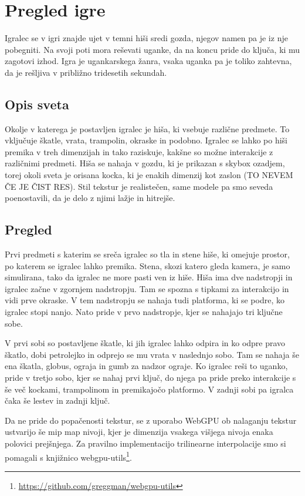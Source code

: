 \documentclass[a4paper,12pt]{article}
\begin{document}
\newpage

\section{Pregled igre}

\noindent Igralec se v igri znajde ujet v temni hiši sredi gozda, njegov namen pa je iz nje pobegniti. Na svoji poti mora reševati uganke, da na koncu pride do ključa, ki mu zagotovi izhod. Igra je ugankarskega žanra, vsaka uganka pa je toliko zahtevna, da je rešljiva v približno tridesetih sekundah.


\subsection{Opis sveta}
\noindent Okolje v katerega je postavljen igralec je hiša, ki vsebuje različne predmete. To vključuje škatle, vrata, trampolin, okraske in podobno. Igralec se lahko po hiši premika v treh dimenzijah in tako raziskuje, kakšne so možne interakcije z različnimi predmeti. Hiša se nahaja v gozdu, ki je prikazan s skybox ozadjem, torej okoli sveta je orisana kocka, ki je enakih dimenzij kot zaslon (TO NEVEM ČE JE ČIST RES).
Stil tekstur je realistečen, same modele pa smo seveda poenostavili, da je delo z njimi lažje in hitrejše.

\subsection{Pregled}
Prvi predmeti s katerim se sreča igralec so tla in stene hiše, ki omejuje prostor, po katerem se igralec lahko premika. Stena, skozi katero gleda kamera, je samo simulirana, tako da igralec ne more pasti ven iz hiše. Hiša ima dve nadstropji in igralec začne v zgornjem nadstropju. Tam se spozna s tipkami za interakcijo in vidi prve okraske. V tem nadstropju se nahaja tudi platforma, ki se podre, ko igralec stopi nanjo. Nato pride v prvo nadstropje, kjer se nahajajo tri ključne sobe.

 V prvi sobi so postavljene škatle, ki jih igralec lahko odpira in ko odpre pravo škatlo, dobi petrolejko in odprejo se mu vrata v naslednjo sobo. Tam se nahaja še ena škatla, globus, ograja in gumb za nadzor ograje. Ko igralec reši to uganko, pride v tretjo sobo, kjer se nahaj prvi ključ, do njega pa pride preko interakcije s še več kockami, trampolinom in premikajočo platformo. V zadnji sobi pa igralca čaka še lestev in zadnji ključ.
 
Da ne pride do popačenosti tekstur, se z uporabo WebGPU ob nalaganju tekstur ustvarijo še mip map nivoji, kjer je dimenzija vsakega višjega nivoja enaka polovici prejšnjega. Za pravilno implementacijo trilinearne interpolacije smo si pomagali s knjižnico webgpu-utils\footnote{\url{https://github.com/greggman/webgpu-utils}}.
\end{document}
